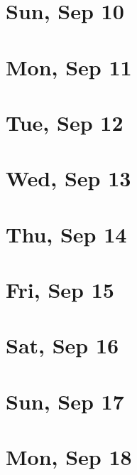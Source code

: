	\section{Sun, Sep 10}
		
		
	\section{Mon, Sep 11}
		
		
	\section{Tue, Sep 12}
		
		
	\section{Wed, Sep 13}
		
		
	\section{Thu, Sep 14}
		
		
	\section{Fri, Sep 15}
		
		
	\section{Sat, Sep 16}
		
		
	\section{Sun, Sep 17}
		
		
	\section{Mon, Sep 18}
		
		
